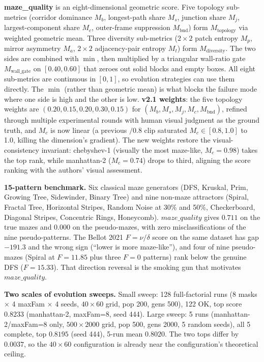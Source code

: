 \noindent\textbf{maze\_quality} is an eight-dimensional geometric score. Five topology sub-metrics (corridor dominance $M_b$, longest-path share $M_s$, junction share $M_j$, largest-component share $M_c$, outer-frame suppression $M_{\text{bnd}}$) form $M_{\text{topology}}$ via weighted geometric mean. Three diversity sub-metrics ($2{\times}2$ patch entropy $M_p$, mirror asymmetry $M_a$, $2{\times}2$ adjacency-pair entropy $M_t$) form $M_{\text{diversity}}$. The two sides are combined with $\min$, then multiplied by a triangular wall-ratio gate $M_{\text{wall\_gate}}$ on $[0.40, 0.60]$ that zeroes out solid blocks and empty boxes. All eight sub-metrics are continuous in $[0,1]$, so evolution strategies can use them directly. The $\min$ (rather than geometric mean) is what blocks the failure mode where one side is high and the other is low. \textbf{v2.1 weights}: the five topology weights are $(0.20, 0.15, 0.20, 0.30, 0.15)$ for $(M_b, M_s, M_j, M_c, M_{\text{bnd}})$, refined through multiple experimental rounds with human visual judgment as the ground truth, and $M_c$ is now linear (a previous $/0.8$ clip saturated $M_c \in [0.8, 1.0]$ to 1.0, killing the dimension's gradient). The new weights restore the visual-consistency invariant: chebyshev-1 (visually the most maze-like, $M_c = 0.98$) takes the top rank, while manhattan-2 ($M_c = 0.74$) drops to third, aligning the score ranking with the authors' visual assessment.

\noindent\textbf{15-pattern benchmark.} Six classical maze generators (DFS, Kruskal, Prim, Growing Tree, Sidewinder, Binary Tree) and nine non-maze attractors (Spiral, Fractal Tree, Horizontal Stripes, Random Noise at 30\% and 50\%, Checkerboard, Diagonal Stripes, Concentric Rings, Honeycomb). $maze\_quality$ gives $0.711$ on the true mazes and $0.000$ on the pseudo-mazes, with zero misclassifications of the nine pseudo-patterns. The Bellot 2021 $F = \nu/\delta$ score on the same dataset has gap $-191.3$ and the wrong sign (``lower is more maze-like''), and four of nine pseudo-mazes (Spiral at $F{=}11.85$ plus three $F{=}0$ patterns) rank below the genuine DFS ($F{=}15.33$). That direction reversal is the smoking gun that motivates $maze\_quality$.

\noindent\textbf{Two scales of evolution sweeps.} Small sweep: 128 full-factorial runs (8 masks $\times$ 4 maxFam $\times$ 4 seeds, $40{\times}60$ grid, pop 200, gens 500), 122 OK, top score $0.8233$ (manhattan-2, maxFam=8, seed 444). Large sweep: 5 runs (manhattan-2/maxFam=8 only, $500{\times}2000$ grid, pop 500, gens 2000, 5 random seeds), all 5 complete, top $0.8195$ (seed 444), 5-run mean $0.8020$. The two tops differ by $0.0037$, so the $40{\times}60$ configuration is already near the configuration's theoretical ceiling.


